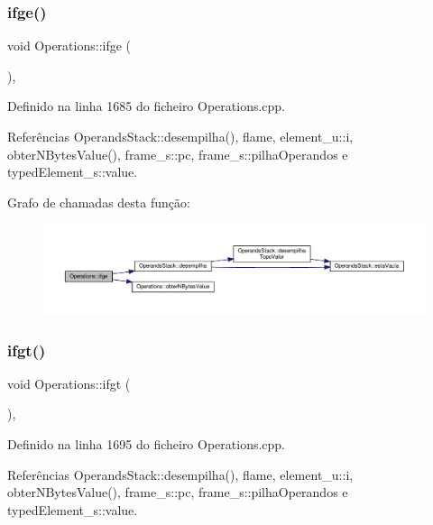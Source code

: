 \subsubsection{\texorpdfstring{ifge()}{ifge()}}
{\footnotesize\ttfamily void Operations\+::ifge (\begin{DoxyParamCaption}{ }\end{DoxyParamCaption})\hspace{0.3cm}{\ttfamily [static]}, {\ttfamily [private]}}



Definido na linha 1685 do ficheiro Operations.\+cpp.



Referências Operands\+Stack\+::desempilha(), flame, element\+\_\+u\+::i, obter\+N\+Bytes\+Value(), frame\+\_\+s\+::pc, frame\+\_\+s\+::pilha\+Operandos e typed\+Element\+\_\+s\+::value.

Grafo de chamadas desta função\+:
\nopagebreak
\begin{figure}[H]
\begin{center}
\leavevmode
\includegraphics[width=350pt]{classOperations_a0e7cf2111ad25ee52aa329cc6ec4d38a_cgraph}
\end{center}
\end{figure}
\mbox{\label{classOperations_afff52b972f58750ea8037aeb02dd22bc}} 
\subsubsection{\texorpdfstring{ifgt()}{ifgt()}}
{\footnotesize\ttfamily void Operations\+::ifgt (\begin{DoxyParamCaption}{ }\end{DoxyParamCaption})\hspace{0.3cm}{\ttfamily [static]}, {\ttfamily [private]}}



Definido na linha 1695 do ficheiro Operations.\+cpp.



Referências Operands\+Stack\+::desempilha(), flame, element\+\_\+u\+::i, obter\+N\+Bytes\+Value(), frame\+\_\+s\+::pc, frame\+\_\+s\+::pilha\+Operandos e typed\+Element\+\_\+s\+::value.

